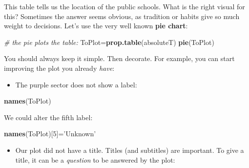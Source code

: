\documentclass[]{article}
\newenvironment{Shaded}{\begin{snugshade}}{\end{snugshade}}
\newcommand{\KeywordTok}[1]{\textcolor[rgb]{0.13,0.29,0.53}{\textbf{#1}}}
\newcommand{\DataTypeTok}[1]{\textcolor[rgb]{0.13,0.29,0.53}{#1}}
\newcommand{\DecValTok}[1]{\textcolor[rgb]{0.00,0.00,0.81}{#1}}
\newcommand{\StringTok}[1]{\textcolor[rgb]{0.31,0.60,0.02}{#1}}
\newcommand{\CommentTok}[1]{\textcolor[rgb]{0.56,0.35,0.01}{\textit{#1}}}
\newcommand{\OperatorTok}[1]{\textcolor[rgb]{0.81,0.36,0.00}{\textbf{#1}}}
\newcommand{\NormalTok}[1]{#1}
\providecommand{\tightlist}{%
  \setlength{\itemsep}{0pt}\setlength{\parskip}{0pt}}
\begin{document}
\begin{Shaded}
\end{Shaded}

This table tells us the location of the public schools. What is the
right visual for this? Sometimes the answer seems obvious, as tradition
or habits give so much weight to decisions. Let's use the very well
known \textbf{pie chart}:

\begin{Shaded}
\begin{Highlighting}[]
\CommentTok{# the pie plots the table:}
\NormalTok{ToPlot=}\KeywordTok{prop.table}\NormalTok{(absoluteT)}
\KeywordTok{pie}\NormalTok{(ToPlot)}
\end{Highlighting}
\end{Shaded}

You should always keep it simple. Then decorate. For example, you can
start improving the plot you already \emph{have}:

\begin{itemize}
\tightlist
\item
  The purple sector does not show a label:
\end{itemize}

\begin{Shaded}
\begin{Highlighting}[]
\KeywordTok{names}\NormalTok{(ToPlot)}
\end{Highlighting}
\end{Shaded}

We could alter the fifth label:

\begin{Shaded}
\begin{Highlighting}[]
\KeywordTok{names}\NormalTok{(ToPlot)[}\DecValTok{5}\NormalTok{]=}\StringTok{'Unknown'}
\end{Highlighting}
\end{Shaded}

\begin{itemize}
\tightlist
\item
  Our plot did not have a title. Titles (and subtitles) are important.
  To give a title, it can be a \emph{question} to be answered by the
  plot:
\end{itemize}
\end{document}

